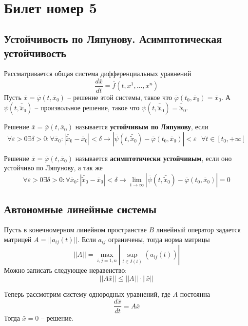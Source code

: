 \documentclass[a4paper, 12pt]{article}
\begin{document}
    \section{Билет номер 5}
    \subsection{Устойчивость по Ляпунову. Асимптотическая устойчивость}
    Рассматривается общая система дифференциальных уравнений
    \begin{equation}
    	\frac{d\bar{x}}{dt} = \bar{f}(t, x^1, \dots, x^n)
    \end{equation}
    Пусть $\bar{x} = \bar{\varphi}(t, \bar{x}_0)$ -- решение этой системы, такое что $\bar{\varphi}(t_0, \bar{x}_0) = \bar{x}_0$. А $\psi(t, \bar{\tilde{x}}_0)$ -- произвольное решение, такое что $\psi(t, \bar{\tilde{x}}_0) = \bar{\tilde{x}}_0$.
    \begin{definition}
    	Решение $\bar{x} = \bar{\varphi}(t, \bar{x}_0)$ называется \textbf{устойчивым по Ляпунову}, если
    	\[
    		\forall \varepsilon >0\exists \delta > 0:\forall \bar{x}_0: |\bar{\tilde{x}}_0 - \bar{x}_0|<\delta \to |\bar{\psi}(t, \bar{\tilde{x}}_0) -  \bar{\varphi}(t_0, \bar{x}_0)|<\varepsilon\text{ } \forall t\in[t_0, +\infty]
    	\]
    \end{definition}
		
	\begin{definition}
		Решение $\bar{x} = \bar{\varphi}(t, \bar{x}_0)$ называется \textbf{асимптотически устойчивым}, если оно устойчиво по Ляпунову, а так же
		\[
			\forall \varepsilon > 0\exists \delta>0:\forall \bar{x}_0: |\bar{\tilde{x}}_0 - \bar{x}_0|<\delta \to \lim_{t\to\infty}|\bar{\psi}(t, \bar{\tilde{x}}_0) -  \bar{\varphi}(t_0, \bar{x}_0)|=0
		\]
	\end{definition}

	\subsection{Автономные линейные системы}
	
	Пусть в конечномерном линейном пространстве $B$ линейный оператор задается матрицей $A=||a_{ij}(t)||$. Если $a_{ij}$ ограничены, тогда норма матрицы 
	\[
		||A|| = \max_{i,j =\overline{1,n}}|\sup_{t\in I(t)}(a_{ij}(t))|
	\]
	Можно записать следующее неравенство:
	\[
		||A\bar{x}||\leq ||A||\cdot||\bar{x}||
	\]
	
	Теперь рассмотрим систему однородных уравнений, где $A$ постоянна
	\begin{equation}
		\frac{d\bar{x}}{dt} = A\bar{x}
		\label{equ:issue12sys}
	\end{equation}
	Тогда $\bar{x} = 0$ -- решение.
	
\end{document}
